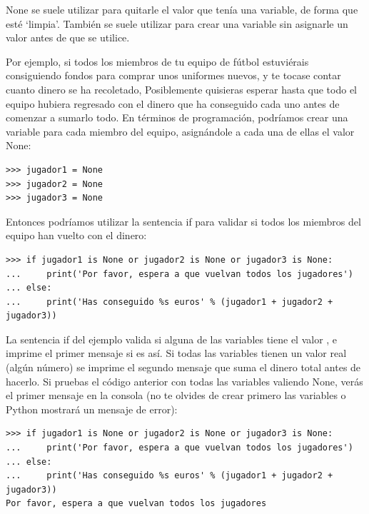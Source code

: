 None se suele utilizar para quitarle el valor que tenía una variable, de forma que esté `limpia'. También se suele utilizar para crear una variable sin asignarle un valor antes de que se utilice.
\par
Por ejemplo, si todos los miembros de tu equipo de fútbol estuviérais consiguiendo fondos para comprar unos uniformes nuevos, y te tocase contar cuanto dinero se ha recoletado, Posiblemente quisieras esperar hasta que todo el equipo hubiera regresado con el dinero que ha conseguido cada uno antes de comenzar a sumarlo todo.  En términos de programación, podríamos crear una variable para cada miembro del equipo, asignándole a cada una de ellas el valor None:

\begin{listing}
\begin{verbatim}
>>> jugador1 = None
>>> jugador2 = None
>>> jugador3 = None
\end{verbatim}
\end{listing}

Entonces podríamos utilizar la sentencia if para validar si todos los miembros del equipo han vuelto con el dinero:

\begin{listing}
\begin{verbatim}
>>> if jugador1 is None or jugador2 is None or jugador3 is None:
...     print('Por favor, espera a que vuelvan todos los jugadores')
... else:
...     print('Has conseguido %s euros' % (jugador1 + jugador2 + jugador3))
\end{verbatim}
\end{listing}

La sentencia if del ejemplo valida si alguna de las variables tiene el valor , e imprime el primer mensaje si es así.  Si todas las variables tienen un valor real (algún número) se imprime el segundo mensaje que suma el dinero total antes de hacerlo.   Si pruebas el código anterior con todas las variables valiendo None, verás el primer mensaje en la consola (no te olvides de crear primero las variables o Python mostrará un mensaje de error): 

\begin{listing}
\begin{verbatim}
>>> if jugador1 is None or jugador2 is None or jugador3 is None:
...     print('Por favor, espera a que vuelvan todos los jugadores')
... else:
...     print('Has conseguido %s euros' % (jugador1 + jugador2 + jugador3))
Por favor, espera a que vuelvan todos los jugadores
\end{verbatim}
\end{listing}

